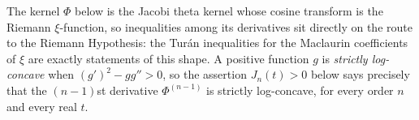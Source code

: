 The kernel $\Phi$ below is the Jacobi theta kernel whose cosine transform is the Riemann $\xi$-function, so inequalities among its derivatives sit directly on the route to the Riemann Hypothesis: the Turán inequalities for the Maclaurin coefficients of $\xi$ are exactly statements of this shape.  A positive function $g$ is \emph{strictly log-concave} when $(g')^2-gg''>0$, so the assertion $J_n(t)>0$ below says precisely that the $(n-1)$st derivative $\Phi^{(n-1)}$ is strictly log-concave, for every order $n$ and every real $t$.
